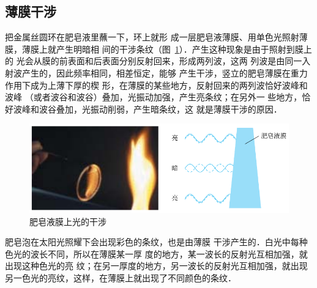 \subsection{薄膜干涉}
把金属丝圆环在肥皂液里蘸一下，环上就形
成一层肥皂液薄膜、用单色光照射薄膜，薄膜上就产生明暗相
间的干涉条纹（图~\ref{fig_C_6-4}）．产生这种现象是由于照射到膜上的
光会从膜的前表面和后表面分别反射回来，形成两列波，这两
列波是由同一入射波产生的，因此频率相同，相差恒定，能够
产生干涉，竖立的肥皂薄膜在重力作用下成为上薄下厚的楔
形，在薄膜的某些地方，反射回来的两列波恰好波峰和波峰
（或者波谷和波谷）叠加，光振动加强，产生亮条纹；在另外一
些地方，恰好波峰和波谷叠加，光振动削弱，产生暗条纹，这
就是薄膜干涉的原因．
\begin{figure}[htbp]
    \centering
    \includegraphics{fig/C/6-4.pdf}
    \caption{肥皂液膜上光的干涉}\label{fig_C_6-4}
\end{figure}


肥皂泡在太阳光照耀下会出现彩色的条纹，也是由薄膜
干涉产生的．白光中每种色光的波长不同，所以在薄膜某一厚
度的地方，某一波长的反射光互相加强，就出现这种色光的亮
纹；在另一厚度的地方，另一波长的反射光互相加强，就出现
另一色光的亮纹，这样，在薄膜上就出现了不同颜色的条纹．

